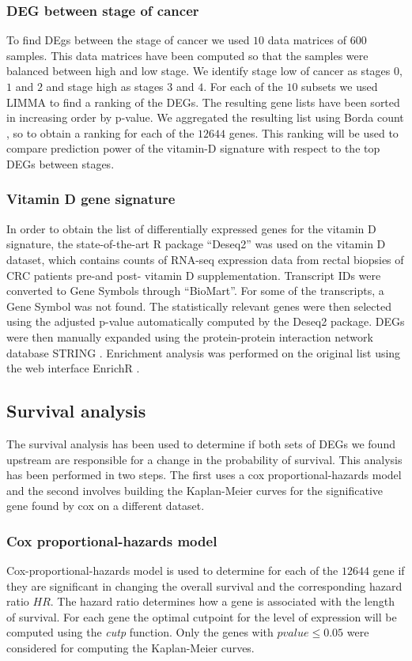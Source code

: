 \documentclass[fleqn,10pt]{SelfArx} %
\begin{document}
		\subsubsection{DEG between stage of cancer}
			To find DEgs between the stage of cancer we used $10$ data matrices of $600$ samples.
			This data matrices have been computed so that the samples were balanced between high and low stage.
			We identify stage low of cancer as stages $0$, $1$ and $2$ and stage high as stages $3$ and $4$.
			For each of the $10$ subsets we used LIMMA \cite{limma} to find a ranking of the DEGs.
			The resulting gene lists have been sorted in increasing order by p-value.
			We aggregated the resulting list using Borda count \cite{borda}, so to obtain a ranking for each of the $12644$ genes.
			This ranking will be used to compare prediction power of the vitamin-D signature with respect to the top DEGs between stages.

		\subsubsection{Vitamin D gene signature}
			In order to obtain the list of differentially expressed genes for the vitamin D signature, the state-of-the-art R package “Deseq2” \cite{deseq2} was used on the vitamin D dataset, which contains counts of RNA-seq expression data from rectal biopsies of CRC patients pre-and post- vitamin D supplementation. Transcript IDs were converted to Gene Symbols through “BioMart”. For some of the transcripts, a Gene Symbol was not found. The statistically relevant genes were then selected using the adjusted p-value automatically computed by the Deseq2 package. DEGs were then manually expanded using the protein-protein interaction network database STRING \cite{string}.
			Enrichment analysis was performed on the original list using the web interface EnrichR \cite{enrichr}.


	\subsection{Survival analysis}
		The survival analysis has been used to determine if both sets of DEGs we found upstream are responsible for a change in the probability of survival.
		This analysis has been performed in two steps.
		The first uses a cox proportional-hazards model and the second involves building the Kaplan-Meier curves for the significative gene found by cox on a different dataset.

		\subsubsection{Cox proportional-hazards model}
			Cox-proportional-hazards model \cite{cox} is used to determine for each of the $12644$ gene if they are significant in changing the overall survival and the corresponding hazard ratio $HR$.
			The hazard ratio determines how a gene is associated with the length of survival.
			For each gene the optimal cutpoint for the level of expression will be computed using the \emph{cutp} \cite{cutp} function.
			Only the genes with $pvalue \le 0.05$ were considered for computing the Kaplan-Meier curves.
\end{document}
